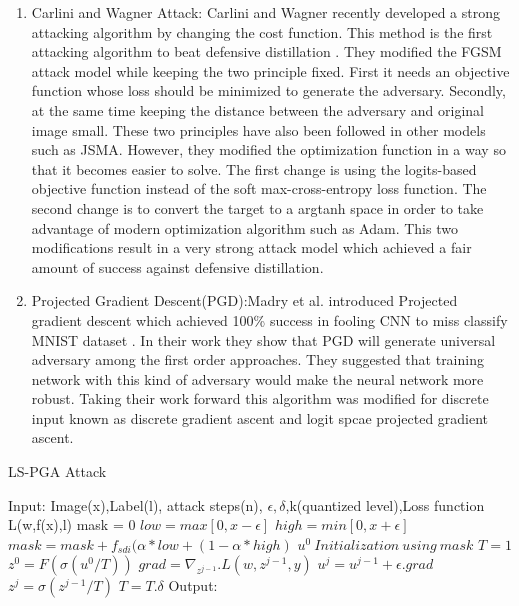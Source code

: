 \documentclass[conference]{IEEEtran}
\begin{document}
\begin{enumerate}
\item Carlini and Wagner Attack: Carlini and Wagner recently developed a strong attacking algorithm by changing the cost function. This method is the first attacking algorithm to beat defensive distillation \cite{carlini2016defensive}. They modified the FGSM attack model while keeping the two principle fixed. First it needs an objective function whose loss should be minimized to generate the adversary. Secondly, at the same time keeping the distance between the adversary and original image small. These two principles have also been followed in other models such as JSMA. However, they modified the optimization function in a way so that it becomes easier to solve. The first change is using the logits-based objective function instead of the soft max-cross-entropy loss function. The second change is to convert the target to a argtanh space in order to take advantage of modern optimization algorithm such as Adam. This two modifications result in a very strong attack model which achieved a fair amount of success against defensive distillation.


\item Projected Gradient Descent(PGD):Madry et al. introduced Projected gradient descent which achieved 100\% success in fooling CNN to miss classify MNIST dataset  \cite{mkadry2017towards}. In their work they show that PGD will generate universal adversary among the first order approaches. They suggested that training network with this kind of adversary would make the neural network more robust. Taking their work forward this algorithm was modified for discrete input \cite{anonymous2018thermometer} known as discrete gradient ascent and logit spcae projected gradient ascent.
\end{enumerate}\begin{algorithm}
   \caption{LS-PGA Attack}
    \begin{algorithmic}
        \State Input: Image(x),Label(l), attack steps(n), $\epsilon,\delta$,k(quantized level),Loss function L(w,f(x),l)
        \State mask = 0
        \State $low =max[0,x-\epsilon]$
        \state $high=min[0,x+\epsilon]$
            \State $mask=mask+f_{sdi}(\alpha*low+(1-\alpha*high)$
        \EndFor \newline
        \state $u^0\ Initialization\ using\ mask$ \newline
        \state $T=1$ \newline
        \state $z^0=F(\sigma(u^0/T))$ \newline
        \newline
             $grad=\nabla_{z^{j-1}}.L(w,z^{j-1},y)$ \newline
            \state $u^j=u^{j-1}+\epsilon.grad$
            \newline
            $z^{j}=\sigma(z^{j-1}/T)$ \newline
            $T=T.\delta$
        \EndFor
        \newline
        Output:\z \after\n\iteration 
    \end{algorithmic}
\end{algorithm}
\end{document}
